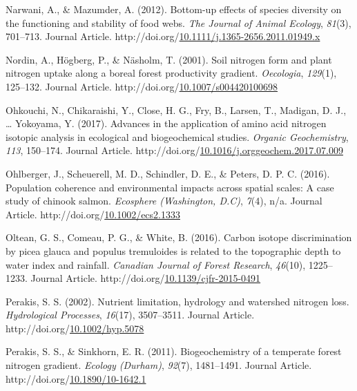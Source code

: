 \documentclass [11pt, proquest] {uwthesis}[2015/03/03]
\newlength{\cslhangindent}
\newenvironment{CSLReferences}%
{\setlength{\parindent}{0pt}%
\everypar{\setlength{\hangindent}{\cslhangindent}}\ignorespaces}%
{\par}
\begin{document}
\begin{CSLReferences}{1}{0}
\leavevmode\hypertarget{ref-Narwani2012}{}%
Narwani, A., \& Mazumder, A. (2012). Bottom-up effects of species diversity on the functioning and stability of food webs. \emph{The Journal of Animal Ecology}, \emph{81}(3), 701--713. Journal Article. http://doi.org/\href{https://doi.org/10.1111/j.1365-2656.2011.01949.x}{10.1111/j.1365-2656.2011.01949.x}

\leavevmode\hypertarget{ref-Nordin2001}{}%
Nordin, A., Högberg, P., \& Näsholm, T. (2001). Soil nitrogen form and plant nitrogen uptake along a boreal forest productivity gradient. \emph{Oecologia}, \emph{129}(1), 125--132. Journal Article. http://doi.org/\href{https://doi.org/10.1007/s004420100698}{10.1007/s004420100698}

\leavevmode\hypertarget{ref-Ohkouchi2017}{}%
Ohkouchi, N., Chikaraishi, Y., Close, H. G., Fry, B., Larsen, T., Madigan, D. J., \ldots{} Yokoyama, Y. (2017). Advances in the application of amino acid nitrogen isotopic analysis in ecological and biogeochemical studies. \emph{Organic Geochemistry}, \emph{113}, 150--174. Journal Article. http://doi.org/\href{https://doi.org/10.1016/j.orggeochem.2017.07.009}{10.1016/j.orggeochem.2017.07.009}

\leavevmode\hypertarget{ref-Ohlberger2016}{}%
Ohlberger, J., Scheuerell, M. D., Schindler, D. E., \& Peters, D. P. C. (2016). Population coherence and environmental impacts across spatial scales: A case study of chinook salmon. \emph{Ecosphere (Washington, D.C)}, \emph{7}(4), n/a. Journal Article. http://doi.org/\href{https://doi.org/10.1002/ecs2.1333}{10.1002/ecs2.1333}

\leavevmode\hypertarget{ref-Oltean2016}{}%
Oltean, G. S., Comeau, P. G., \& White, B. (2016). Carbon isotope discrimination by picea glauca and populus tremuloides is related to the topographic depth to water index and rainfall. \emph{Canadian Journal of Forest Research}, \emph{46}(10), 1225--1233. Journal Article. http://doi.org/\href{https://doi.org/10.1139/cjfr-2015-0491}{10.1139/cjfr-2015-0491}

\leavevmode\hypertarget{ref-Perakis2002}{}%
Perakis, S. S. (2002). Nutrient limitation, hydrology and watershed nitrogen loss. \emph{Hydrological Processes}, \emph{16}(17), 3507--3511. Journal Article. http://doi.org/\href{https://doi.org/10.1002/hyp.5078}{10.1002/hyp.5078}

\leavevmode\hypertarget{ref-Perakis2011}{}%
Perakis, S. S., \& Sinkhorn, E. R. (2011). Biogeochemistry of a temperate forest nitrogen gradient. \emph{Ecology (Durham)}, \emph{92}(7), 1481--1491. Journal Article. http://doi.org/\href{https://doi.org/10.1890/10-1642.1}{10.1890/10-1642.1}


\end{CSLReferences}
\end{document}
